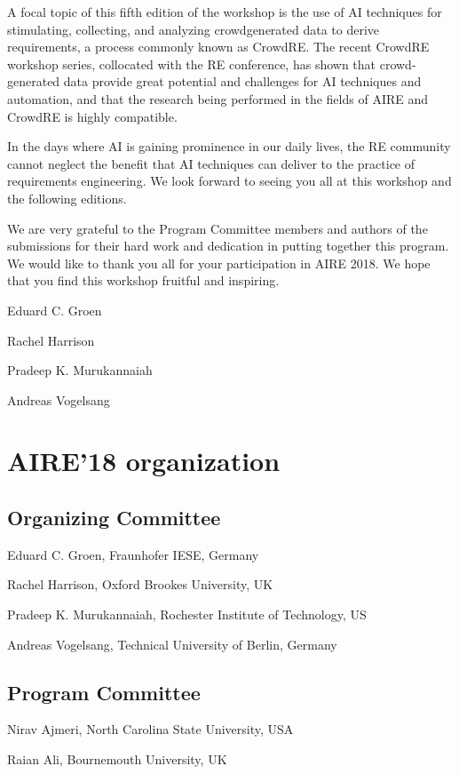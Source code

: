 \documentclass[conference,9pt]{IEEEtran}
\begin{document}
A focal topic of this fifth edition of the workshop is the use of AI techniques for stimulating, collecting, and analyzing crowdgenerated data to derive requirements, a process commonly known as CrowdRE. The recent CrowdRE workshop series, collocated with the RE conference, has shown that crowd-generated data provide great potential and challenges for AI techniques and automation, and that the research being performed in the fields of AIRE and CrowdRE is highly compatible.

In the days where AI is gaining prominence in our daily lives, the RE community cannot neglect the benefit that AI techniques can deliver to the practice of requirements engineering. We look forward to seeing you all at this workshop and the following editions. 

We are very grateful to the Program Committee members and authors of the submissions for their hard work and dedication in putting together this program. We would like to thank you all for your participation in AIRE 2018. We hope that you find this workshop fruitful and inspiring.

\vspace{0.5cm}

Eduard C. Groen 

Rachel Harrison 

Pradeep K. Murukannaiah 

Andreas Vogelsang 




\section*{AIRE'18 organization}
\subsection{Organizing Committee}
Eduard C. Groen, Fraunhofer IESE, Germany

Rachel Harrison, Oxford Brookes University, UK

Pradeep K. Murukannaiah, Rochester Institute of Technology, US

Andreas Vogelsang, Technical University of Berlin, Germany


\subsection{Program Committee}
Nirav Ajmeri, North Carolina State University, USA

Raian Ali, Bournemouth University, UK
\end{document}
